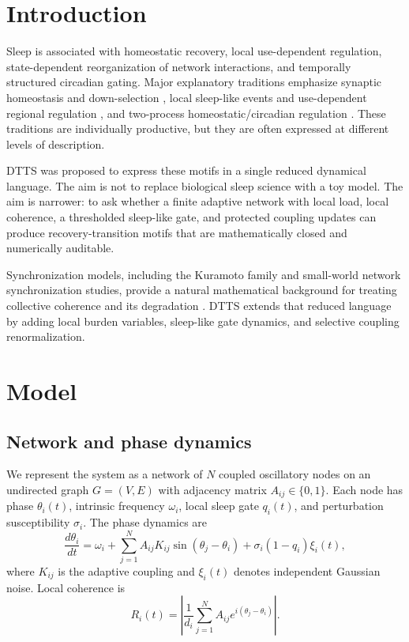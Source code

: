 \documentclass[11pt,a4paper]{article}
\begin{document}
\section{Introduction}
Sleep is associated with homeostatic recovery, local use-dependent regulation, state-dependent reorganization of network interactions, and temporally structured circadian gating. Major explanatory traditions emphasize synaptic homeostasis and down-selection \cite{Tononi2003,Tononi2006,Cirelli2015,Tononi2014}, local sleep-like events and use-dependent regional regulation \cite{Vyazovskiy2011,Krueger2019,Siclari2018}, and two-process homeostatic/circadian regulation \cite{Borbely2022,Deboer2018}. These traditions are individually productive, but they are often expressed at different levels of description.

DTTS was proposed to express these motifs in a single reduced dynamical language. The aim is not to replace biological sleep science with a toy model. The aim is narrower: to ask whether a finite adaptive network with local load, local coherence, a thresholded sleep-like gate, and protected coupling updates can produce recovery-transition motifs that are mathematically closed and numerically auditable.

Synchronization models, including the Kuramoto family and small-world network synchronization studies, provide a natural mathematical background for treating collective coherence and its degradation \cite{Acebron2005,Hong2002}. DTTS extends that reduced language by adding local burden variables, sleep-like gate dynamics, and selective coupling renormalization.

\section{Model}
\subsection{Network and phase dynamics}
We represent the system as a network of $N$ coupled oscillatory nodes on an undirected graph $G=(V,E)$ with adjacency matrix $A_{ij}\in\{0,1\}$. Each node has phase $\theta_i(t)$, intrinsic frequency $\omega_i$, local sleep gate $q_i(t)$, and perturbation susceptibility $\sigma_i$. The phase dynamics are
\begin{equation}
\frac{d\theta_i}{dt}=\omega_i+\sum_{j=1}^{N}A_{ij}K_{ij}\sin(\theta_j-\theta_i)+\sigma_i(1-q_i)\xi_i(t),
\end{equation}
where $K_{ij}$ is the adaptive coupling and $\xi_i(t)$ denotes independent Gaussian noise. Local coherence is
\begin{equation}
R_i(t)=\left|\frac{1}{d_i}\sum_{j=1}^{N}A_{ij}e^{i(\theta_j-\theta_i)}\right|.
\end{equation}
\end{document}
